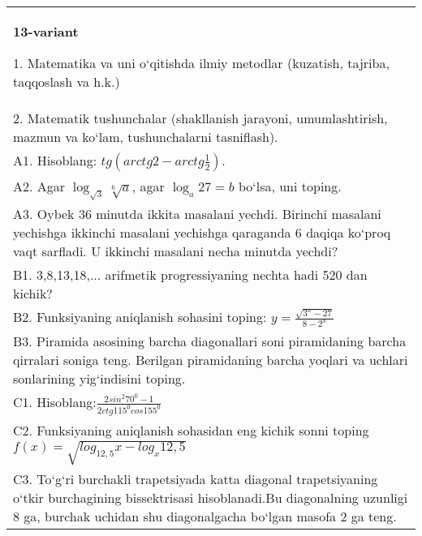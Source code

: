 \documentclass{article}
\begin{document}
\begin{tabular}{m{17cm}}
\textbf{13-variant}

1. Matematika va uni o‘qitishda ilmiy metodlar (kuzatish, tajriba, taqqoslash va h.k.) \\
2. Matematik tushunchalar (shakllanish jarayoni, umumlashtirish, mazmun va ko‘lam, tushunchalarni tasniflash). \\
A1. Hisoblang: \(tg\left (arctg2 - arctg\frac{1}{2} \right) \). \\
A2. Agar \(\log_{\sqrt{3}}\sqrt[6]{a}\), agar \(\log_{a}27 = b\) bo‘lsa, uni toping. \\
A3. Oybek 36 minutda ikkita masalani yechdi. Birinchi masalani yechishga ikkinchi masalani yechishga qaraganda 6 daqiqa ko‘proq vaqt sarfladi. U ikkinchi masalani necha minutda yechdi? \\
B1. 3,8,13,18,... arifmetik progressiyaning nechta hadi 520 dan kichik? \\
B2. Funksiyaning aniqlanish sohasini toping: \(y = \frac{\sqrt{3^{x} - 27}}{8 - 2^{x}}\) \\
B3. Piramida asosining barcha diagonallari soni piramidaning barcha qirralari soniga teng. Berilgan piramidaning barcha yoqlari va uchlari sonlarining yig‘indisini toping. \\
C1. Hisoblang:\(\frac{2sin^{2}70^{0} - 1}{2ctg115^{0}cos155^{0}}\) \\
C2. Funksiyaning aniqlanish sohasidan eng kichik sonni toping \(f (x) = \sqrt{log_{12,5}x - log_{x}12,5}\) \\
C3. To‘g‘ri burchakli trapetsiyada katta diagonal trapetsiyaning o‘tkir burchagining bissektrisasi hisoblanadi.Bu diagonalning uzunligi 8 ga, burchak uchidan shu diagonalgacha bo‘lgan masofa 2 ga teng. \\

\end{tabular}
\vspace{1cm}
\end{document}
